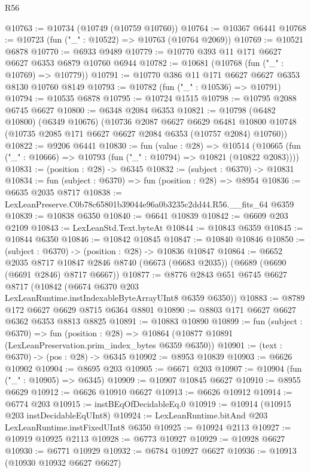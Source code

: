 \begin{lexlean}{R56}
\begin{coremodule}
@10763 := @10734 (@10749 (@10759 @10760))
@10764 := @10367 @6441
@10768 := @10723 (fun ("_" : @10522) => @10763 (@10764 @2069))
@10769 := @10521 @6878
@10770 := @6933 @9489
@10779 := @10770 @393 @11 @171 @6627 @6627 @6353 @6879 @10760 @6944
@10782 := @10681 (@10768 (fun ("_" : @10769) => @10779))
@10791 := @10770 @386 @11 @171 @6627 @6627 @6353 @8130 @10760 @8149
@10793 := @10782 (fun ("_" : @10536) => @10791)
@10794 := @10535 @6878
@10795 := @10724 @1515
@10798 := @10795 @2088 @6745 @6627
@10800 := @6348 @2084 @6353
@10821 := @10798
    (@6482 @10800)
    (@6349 @10676)
    (@10736
      @2087
      @6627
      @6629
      @6481
      @10800
      @10748
      (@10735 @2085 @171 @6627 @6627 @2084 @6353 (@10757 @2084) @10760))
@10822 := @9206 @6441
@10830 := fun (value : @28) =>
  @10514 (@10665 (fun ("_" : @10666) => @10793 (fun ("_" : @10794) => @10821 (@10822 @2083))))
@10831 := (position : @28) -> @6345
@10832 := (subject : @6370) -> @10831
@10834 := fun (subject : @6370) => fun (position : @28) => @8954
@10836 := @6635 @2035 @8717
@10838 := LexLeanPreserve.C0b78c65801b39044e96a0b3235c2dd44.R56.__fits_64 @6359
@10839 := @10838 @6350
@10840 := @6641 @10839
@10842 := @6609 @203 @2109
@10843 := LexLeanStd.Text.byteAt
@10844 := @10843 @6359
@10845 := @10844 @6350
@10846 := @10842 @10845
@10847 := @10840 @10846
@10850 := (subject : @6370) -> (position : @28) -> @10836 @10847
@10864 := @6652
    @2035
    @8717
    @10847
    @2846
    @8740
    (@6673 (@6683 @2035))
    (@6689 (@6690 (@6691 @2846) @8717 @6667))
@10877 := @8776
    @2843
    @651
    @6745
    @6627
    @8717
    (@10842 (@6674 @6370 @203 LexLeanRuntime.instIndexableByteArrayUInt8 @6359 @6350))
@10883 := @8789 @172 @6627 @6629 @8715 @6364 @8801
@10890 := @8803 @171 @6627 @6627 @6362 @6353 @8813 @8825
@10891 := @10883 @10890
@10899 := fun (subject : @6370) =>
  fun (position : @28) => @10864 (@10877 @10891 (LexLeanPreservation.prim_index_bytes @6359 @6350))
@10901 := (text : @6370) -> (pos : @28) -> @6345
@10902 := @8953 @10839
@10903 := @6626 @10902
@10904 := @8695 @203
@10905 := @6671 @203
@10907 := @10904 (fun ("_" : @10905) => @6345)
@10909 := @10907 @10845 @6627
@10910 := @8955 @6629
@10912 := @6626 @10910 @6627
@10913 := @6626 @10912
@10914 := @6774 @203
@10915 := instBEqOfDecidableEq.{0}
@10919 := @10914 (@10915 @203 instDecidableEqUInt8)
@10924 := LexLeanRuntime.bitAnd @203 LexLeanRuntime.instFixedUInt8 @6350
@10925 := @10924 @2113
@10927 := @10919 @10925 @2113
@10928 := @6773 @10927
@10929 := @10928 @6627
@10930 := @6771 @10929
@10932 := @6784 @10927 @6627
@10936 := @10913 (@10930 @10932 @6627 @6627)

\end{coremodule}
\end{lexlean}
